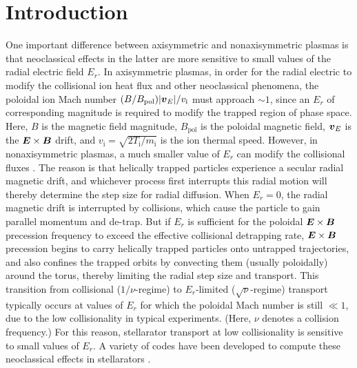 \documentclass[12pt,superscriptaddress]{revtex4}
\newcommand{\vect}[1]{\mbox{\boldmath $#1$}}
\newcommand{\vi}{v_{\mathrm{i}}}
\newcommand{\mi}{m_{\mathrm{i}}}
\newcommand{\Ti}{T_{\mathrm{i}}}
\newcommand{\Bpol}{B_{\mathrm{pol}}}
\begin{document}
\pacs{}%

\maketitle %


\section{Introduction}

One important difference between axisymmetric and nonaxisymmetric plasmas is
that neoclassical effects in the latter are more sensitive to small values of the radial
electric field $E_r$. In axisymmetric plasmas, in order for the radial electric to modify the collisional ion heat flux
and other neoclassical phenomena,
the poloidal ion Mach number $(B / \Bpol) |\vect{v}_E|/\vi$ must approach $\sim 1$,
since an $E_r$ of corresponding magnitude is required to modify the trapped region of phase space\cite{GrishaNeo}.
Here, $B$ is the magnetic field magnitude, $\Bpol$ is the poloidal magnetic field,
$\vect{v}_E$ is the $\vect{E}\times\vect{B}$ drift, and $\vi=\sqrt{2 \Ti / \mi}$ is the ion thermal speed.
However, in nonaxisymmetric plasmas, 
a much smaller value of $E_r$ can modify the collisional fluxes \cite{Galeev, HoKulsrud, BeidlerBigBenchmarking}.
The reason is that helically trapped particles experience a secular radial magnetic drift, and
whichever process first interrupts this radial motion will thereby determine the step size for radial diffusion.
When $E_r=0$, the radial magnetic drift is interrupted by collisions, which cause
the particle to gain parallel momentum and de-trap.
But if $E_r$ is sufficient for the poloidal $\vect{E}\times\vect{B}$
precession frequency to exceed the effective collisional detrapping rate, $\vect{E}\times\vect{B}$ precession
begins to carry helically trapped particles onto untrapped trajectories, 
and also confines the trapped orbits by convecting them (usually poloidally) around the torus,
thereby limiting the radial step size and transport.
This transition from collisional ($1/\nu$-regime) to $E_r$-limited ($\sqrt{\nu}$-regime) transport
typically occurs at values of $E_r$ for which the poloidal Mach number is still $\ll 1$, due to the low collisionality
in typical experiments. (Here, $\nu$ denotes a collision frequency.)
For this reason, stellarator transport at low collisionality is sensitive to small values of $E_r$.
A variety of codes have been developed to compute 
these neoclassical effects in stellarators \cite{DKES1, DKES2, GSRAKE, Tribaldos2001, PENTA, Kernbichler1, FORTEC_PFR, FORTEC_CPC, JOSE}.
\end{document}
